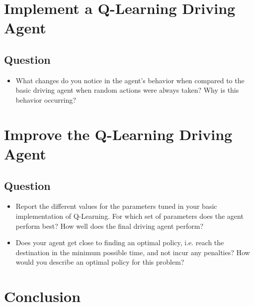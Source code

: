 \documentclass[twoside,openright,titlepage,numbers=noenddot,headinclude,%
               footinclude=true,cleardoublepage=empty,abstractoff,BCOR=5mm,%
               paper=a4,fontsize=11pt,ngerman,american]{scrreprt}
\numberwithin{theorem}{chapter}
\numberwithin{definition}{chapter}
\numberwithin{algorithm}{chapter}
\numberwithin{figure}{chapter}
\numberwithin{table}{chapter}
\numberwithin{equation}{chapter}
\begin{document}
%
%

\chapter*{Implement a Q-Learning Driving Agent}

\section*{Question}

\begin{itemize}
\item What changes do you notice in the agent's behavior when compared to the basic driving agent when random actions were always taken? Why is this behavior occurring?

\end{itemize}


%
%

\chapter*{Improve the Q-Learning Driving Agent}

\section*{Question}

\begin{itemize}
\item Report the different values for the parameters tuned in your basic implementation of Q-Learning. For which set of parameters does the agent perform best? How well does the final driving agent perform?
\item Does your agent get close to finding an optimal policy, i.e. reach the destination in the minimum possible time, and not incur any penalties? How would you describe an optimal policy for this problem?

\end{itemize}

%
%

\chapter*{Conclusion}
\end{document}
